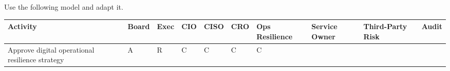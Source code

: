 \documentclass[
  letterpaper,
  DIV=11,
  numbers=noendperiod]{scrartcl}
\begin{document}
Use the following model and adapt it.

\begin{longtable}[]{@{}
  >{\raggedright\arraybackslash}p{}
  >{\raggedright\arraybackslash}p{}
  >{\raggedright\arraybackslash}p{}
  >{\raggedright\arraybackslash}p{}
  >{\raggedright\arraybackslash}p{}
  >{\raggedright\arraybackslash}p{}
  >{\raggedright\arraybackslash}p{}
  >{\raggedright\arraybackslash}p{}
  >{\raggedright\arraybackslash}p{}
  >{\raggedright\arraybackslash}p{}@{}}
\toprule\noalign{}
\begin{minipage}[b]{\linewidth}\raggedright
Activity
\end{minipage} & \begin{minipage}[b]{\linewidth}\raggedright
Board
\end{minipage} & \begin{minipage}[b]{\linewidth}\raggedright
Exec
\end{minipage} & \begin{minipage}[b]{\linewidth}\raggedright
CIO
\end{minipage} & \begin{minipage}[b]{\linewidth}\raggedright
CISO
\end{minipage} & \begin{minipage}[b]{\linewidth}\raggedright
CRO
\end{minipage} & \begin{minipage}[b]{\linewidth}\raggedright
Ops Resilience
\end{minipage} & \begin{minipage}[b]{\linewidth}\raggedright
Service Owner
\end{minipage} & \begin{minipage}[b]{\linewidth}\raggedright
Third-Party Risk
\end{minipage} & \begin{minipage}[b]{\linewidth}\raggedright
Audit
\end{minipage} \\
\midrule\noalign{}
\endhead
\bottomrule\noalign{}
\endlastfoot
Approve digital operational resilience strategy & A & R & C & C & C & C

\end{longtable}
\end{document}
